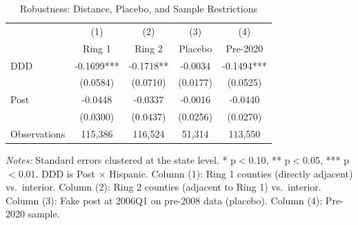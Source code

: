 \begin{table}[H]
\centering
\caption{Robustness: Distance, Placebo, and Sample Restrictions}
\label{tab:robust}
\begin{threeparttable}
\begin{tabular}{lcccc}
\toprule
 & (1) & (2) & (3) & (4) \\
 & Ring 1 & Ring 2 & Placebo & Pre-2020 \\
\midrule
DDD & -0.1699*** & -0.1718** & -0.0034 & -0.1494*** \\
 & (0.0584) & (0.0710) & (0.0177) & (0.0525) \\[3pt]
Post & -0.0448 & -0.0337 & -0.0016 & -0.0440 \\
 & (0.0300) & (0.0437) & (0.0256) & (0.0270) \\[6pt]
Observations & 115,386 & 116,524 & 51,314 & 113,550 \\
\bottomrule
\end{tabular}
\begin{tablenotes}[flushleft]
\small
\item \textit{Notes:} Standard errors clustered at the state level. * p$<$0.10, ** p$<$0.05, *** p$<$0.01. DDD is Post $\times$ Hispanic. Column (1): Ring 1 counties (directly adjacent) vs.\ interior. Column (2): Ring 2 counties (adjacent to Ring 1) vs.\ interior. Column (3): Fake post at 2006Q1 on pre-2008 data (placebo). Column (4): Pre-2020 sample.
\end{tablenotes}
\end{threeparttable}
\end{table}

